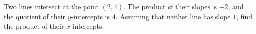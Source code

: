 Two lines intersect at the point $(2,4)$. The product of their slopes is $-2$, and the quotient of their $y$-intercepts is $4$. Assuming that neither line has slope $1$, find the product of their $x$-intercepts.
